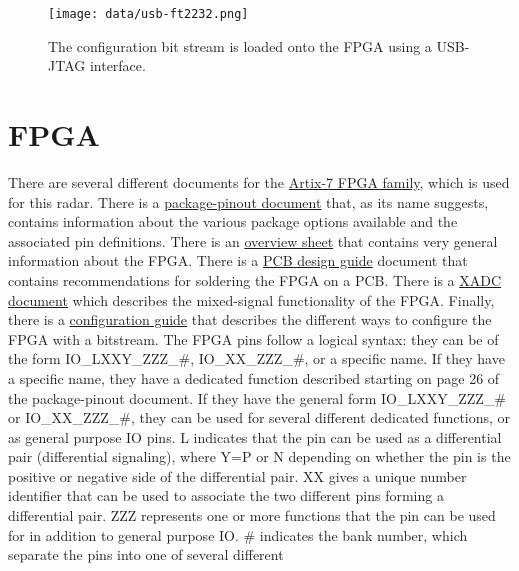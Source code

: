 \documentclass{default}
\begin{document}
\begin{figure}[h]
  \centering
  \texttt{[image: data/usb-ft2232.png]}
  \caption{The configuration bit stream is loaded onto the FPGA using a USB-JTAG interface.}
  \label{fig:usb_ft2232}
\end{figure}

\section{FPGA}
There are several different documents for the
\href{https://www.xilinx.com/products/silicon-devices/fpga/artix-7.html?resultsTablePreSelect=documenttype:Data\%20Sheets#documentation}{Artix-7
  FPGA family}, which is used for this radar. There is a
\href{https://www.xilinx.com/support/documentation/user_guides/ug475_7Series_Pkg_Pinout.pdf}{package-pinout
  document} that, as its name suggests, contains information about the various package options
available and the associated pin definitions. There is an
\href{https://www.xilinx.com/support/documentation/data_sheets/ds180_7Series_Overview.pdf}{overview
  sheet} that contains very general information about the FPGA. There is a
\href{https://www.xilinx.com/support/documentation/user_guides/ug483_7Series_PCB.pdf}{PCB design
  guide} document that contains recommendations for soldering the FPGA on a PCB. There is a
\href{https://www.xilinx.com/support/documentation/user_guides/ug480_7Series_XADC.pdf}{XADC
  document} which describes the mixed-signal functionality of the FPGA. Finally, there is a
\href{https://www.xilinx.com/support/documentation/user_guides/ug470_7Series_Config.pdf}{configuration
  guide} that describes the different ways to configure the FPGA with a bitstream. The FPGA pins
follow a logical syntax: they can be of the form IO\_LXXY\_ZZZ\_\#, IO\_XX\_ZZZ\_\#, or a specific
name. If they have a specific name, they have a dedicated function described starting on page 26 of
the package-pinout document. If they have the general form IO\_LXXY\_ZZZ\_\# or IO\_XX\_ZZZ\_\#,
they can be used for several different dedicated functions, or as general purpose IO pins. L
indicates that the pin can be used as a differential pair (differential signaling), where Y=P or N
depending on whether the pin is the positive or negative side of the differential pair. XX gives a
unique number identifier that can be used to associate the two different pins forming a differential
pair. ZZZ represents one or more functions that the pin can be used for in addition to general
purpose IO. \# indicates the bank number, which separate the pins into one of several different
\end{document}
